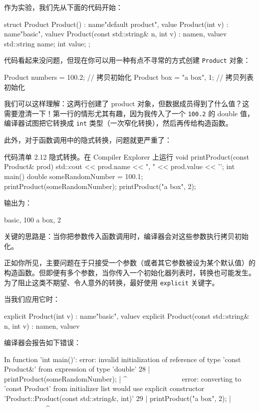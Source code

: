 作为实验，我们先从下面的代码开始：

\begin{codebox}[cpp]
struct Product {
Product() : name{"default product"}, value{} { }
Product(int v) : name{"basic"}, value{v} { }
Product(const std::string& n, int v)
: name{n}, value{v} { }
std::string name;
int value;
};
\end{codebox}

代码看起来没问题，但现在你可以用一种有点不寻常的方式创建 \texttt{Product} 对象：

\begin{codebox}[cpp]
Product numbers = 100.2;
// 拷贝初始化
Product box = {"a box", 1};
// 拷贝列表初始化
\end{codebox}


我们可以这样理解：这两行创建了 product 对象，但数据成员得到了什么值？这需要澄清一下！第一行的情形尤其有趣，因为我传入了一个 \texttt{100.2} 的 double 值，编译器试图把它转换成 \texttt{int} 类型（一次窄化转换），然后再传给构造函数。

此外，对于函数调用中的隐式转换，问题就更严重了：

\begin{codeboxt}[cpp]{代码清单 2.12 隐式转换。在 Compiler Explorer 上运行}
void printProduct(const Product& prod) {
std::cout << prod.name << ", " << prod.value << '\n';
}
int main() {
double someRandomNumber = 100.1;
printProduct(someRandomNumber);
printProduct({"a box", 2});
}
\end{codeboxt}

输出为：

\begin{codebox}[cpp]
basic, 100
a box, 2
\end{codebox}

关键的思路是：当你把参数传入函数调用时，编译器会对这些参数执行拷贝初始化。

正如你所见，主要问题在于只接受一个参数（或者其它参数被设为某个默认值）的构造函数。但即便有多个参数，当你传入一个初始化器列表时，转换也可能发生。为了阻止这类不期望、令人意外的转换，最好使用 \texttt{explicit} 关键字。

当我们应用它时：

\begin{codebox}[cpp]
explicit Product(int v) : name{"basic"}, value{v} { }
explicit Product(const std::string& n, int v) : name{n}, value{v} { }
\end{codebox}

编译器会报告如下错误：

\begin{codebox}[cpp]
In function 'int main()':
error: invalid initialization of reference of type 'const Product&'
from expression of type 'double'
28 |
printProduct(someRandomNumber);
|
^~~~~~~~~~~~~~~~
error: converting to 'const Product' from initializer list would use
explicit constructor 'Product::Product(const std::string&, int)'
29 |
printProduct({"a box", 2});
|
~~~~~~~~~~~~^~~~~~~~~~~~~~
\end{codebox}

